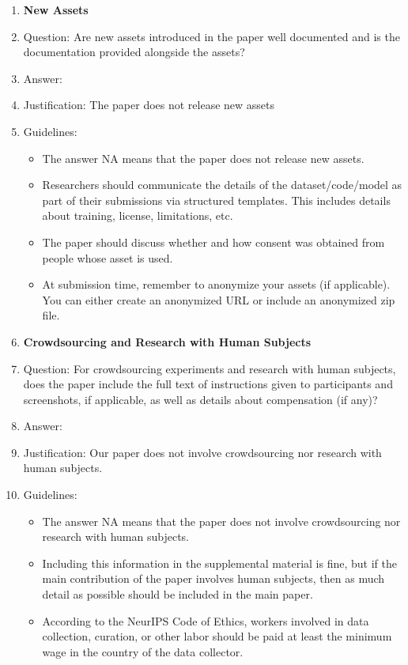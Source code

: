 \documentclass{article}
\theoremstyle{plain}
\theoremstyle{definition}
\theoremstyle{remark}
\begin{document}
\begin{enumerate}
\item {\bf New Assets}
    \item[] Question: Are new assets introduced in the paper well documented and is the documentation provided alongside the assets?
    \item[] Answer: \answerNA{} %
    \item[] Justification: The paper does not release new assets
    \item[] Guidelines:
    \begin{itemize}
        \item The answer NA means that the paper does not release new assets.
        \item Researchers should communicate the details of the dataset/code/model as part of their submissions via structured templates. This includes details about training, license, limitations, etc. 
        \item The paper should discuss whether and how consent was obtained from people whose asset is used.
        \item At submission time, remember to anonymize your assets (if applicable). You can either create an anonymized URL or include an anonymized zip file.
    \end{itemize}

\item {\bf Crowdsourcing and Research with Human Subjects}
    \item[] Question: For crowdsourcing experiments and research with human subjects, does the paper include the full text of instructions given to participants and screenshots, if applicable, as well as details about compensation (if any)? 
    \item[] Answer: \answerNA{} %
    \item[] Justification: Our paper does not involve crowdsourcing nor research with human subjects.
    \item[] Guidelines:
    \begin{itemize}
        \item The answer NA means that the paper does not involve crowdsourcing nor research with human subjects.
        \item Including this information in the supplemental material is fine, but if the main contribution of the paper involves human subjects, then as much detail as possible should be included in the main paper. 
        \item According to the NeurIPS Code of Ethics, workers involved in data collection, curation, or other labor should be paid at least the minimum wage in the country of the data collector. 
    \end{itemize}


\end{enumerate}
\end{document}
